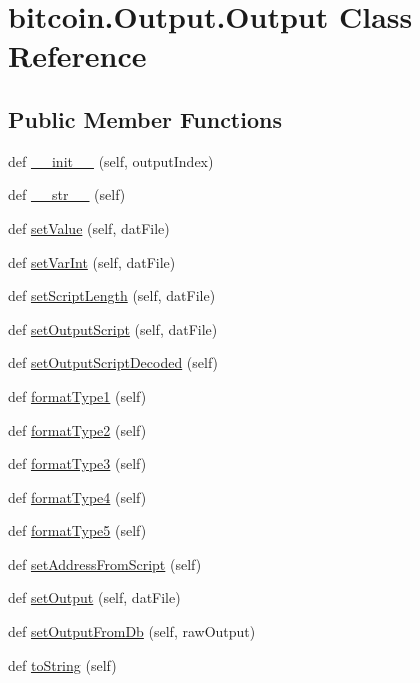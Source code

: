\hypertarget{classbitcoin_1_1Output_1_1Output}{}\section{bitcoin.\+Output.\+Output Class Reference}
\label{classbitcoin_1_1Output_1_1Output}
\subsection*{Public Member Functions}
\begin{DoxyCompactItemize}
\item 
def \hyperlink{classbitcoin_1_1Output_1_1Output_a5a18d7483a597411fe4b164073e1a4c2}{\+\_\+\+\_\+init\+\_\+\+\_\+} (self, output\+Index)
\item 
def \hyperlink{classbitcoin_1_1Output_1_1Output_ad31f2203c0d376fe407636129c7185df}{\+\_\+\+\_\+str\+\_\+\+\_\+} (self)
\item 
def \hyperlink{classbitcoin_1_1Output_1_1Output_a8f6457feae3b3c36ddd6a38e667d5b7b}{set\+Value} (self, dat\+File)
\item 
def \hyperlink{classbitcoin_1_1Output_1_1Output_ab981fb1b985199bf2f7bfb714b86c7d7}{set\+Var\+Int} (self, dat\+File)
\item 
def \hyperlink{classbitcoin_1_1Output_1_1Output_aad31684228d79ee1dae908a10dfed2e7}{set\+Script\+Length} (self, dat\+File)
\item 
def \hyperlink{classbitcoin_1_1Output_1_1Output_a3aeba6f42a3472a3376ea1dd6501c2e6}{set\+Output\+Script} (self, dat\+File)
\item 
def \hyperlink{classbitcoin_1_1Output_1_1Output_a85f571250c481c90fd03ad5ae63ee008}{set\+Output\+Script\+Decoded} (self)
\item 
def \hyperlink{classbitcoin_1_1Output_1_1Output_aaa4b5667466b462befa42c3e70f1967d}{format\+Type1} (self)
\item 
def \hyperlink{classbitcoin_1_1Output_1_1Output_a3e7fc81b5f0635895d4f006f33bb15bd}{format\+Type2} (self)
\item 
def \hyperlink{classbitcoin_1_1Output_1_1Output_aa883c0198abca68df3a62d226ca01203}{format\+Type3} (self)
\item 
def \hyperlink{classbitcoin_1_1Output_1_1Output_a9127830ee4c3b2f03eb6718718242005}{format\+Type4} (self)
\item 
def \hyperlink{classbitcoin_1_1Output_1_1Output_a1c0e7698d1d7c07b2bde7afa2a8f5d94}{format\+Type5} (self)
\item 
def \hyperlink{classbitcoin_1_1Output_1_1Output_af88f18993fc6a6060accd86d607cc252}{set\+Address\+From\+Script} (self)
\item 
def \hyperlink{classbitcoin_1_1Output_1_1Output_ab3de9686dd09b57d2c55e462dbcf1b7e}{set\+Output} (self, dat\+File)
\item 
def \hyperlink{classbitcoin_1_1Output_1_1Output_a42c5e5cc4b37e64aa6133f712c3bc813}{set\+Output\+From\+Db} (self, raw\+Output)
\item 
def \hyperlink{classbitcoin_1_1Output_1_1Output_aa6b49a9e92b00260ba3a5b3fd9752eaa}{to\+String} (self)
\end{DoxyCompactItemize}

